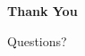 \documentclass[aspectratio=169]{beamer}
\begin{document}

\begin{frame}
    \centering

    \Huge
    \textbf{Thank You}

    \vspace{0.5cm}

    \Large
    Questions?

\end{frame}

\end{document}
